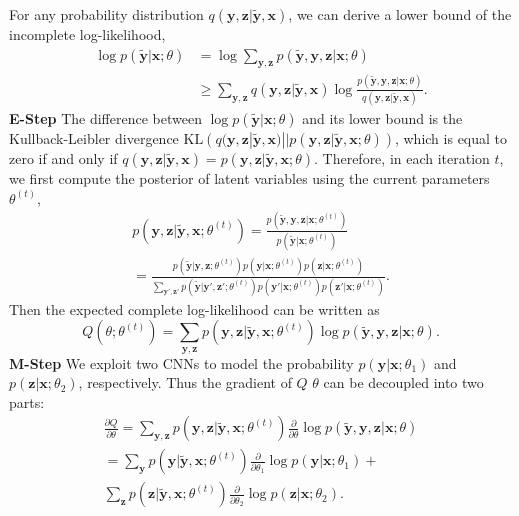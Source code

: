 \documentclass[10pt,twocolumn,letterpaper]{article}
\def\vec{\mathbf}
\begin{document}
For any probability distribution $q(\vec{y}, \vec{z} | \tilde{\vec{y}}, \vec{x})$, we can derive a lower bound of the incomplete log-likelihood,
\begin{equation}
\begin{aligned}
    \log p(\tilde{\vec{y}} | \vec{x}; \theta) &= \log \sum_{\vec{y},\vec{z}} p(\tilde{\vec{y}}, \vec{y}, \vec{z} | \vec{x}; \theta) \\
    &\geq \sum_{\vec{y},\vec{z}} q(\vec{y}, \vec{z} | \tilde{\vec{y}}, \vec{x}) \log \frac{p(\tilde{\vec{y}}, \vec{y}, \vec{z} | \vec{x}; \theta)}{q(\vec{y}, \vec{z} | \tilde{\vec{y}}, \vec{x})}.
\end{aligned}
\end{equation}
\textbf{E-Step} The difference between $\log p(\tilde{\vec{y}} | \vec{x}; \theta)$ and its lower bound is the Kullback-Leibler divergence $\mathrm{KL}\left(q(\vec{y}, \vec{z} | \tilde{\vec{y}}, \vec{x}) || p(\vec{y}, \vec{z} | \tilde{\vec{y}}, \vec{x}; \theta)\right)$, which is equal to zero if and only if $q(\vec{y}, \vec{z} | \tilde{\vec{y}}, \vec{x}) = p(\vec{y}, \vec{z} | \tilde{\vec{y}}, \vec{x}; \theta)$. Therefore, in each iteration $t$, we first compute the posterior of latent variables using the current parameters $\theta^{(t)}$,
\begin{multline} \label{eq:posterior}
    p(\vec{y}, \vec{z} | \tilde{\vec{y}}, \vec{x}; \theta^{(t)}) = \frac{p(\tilde{\vec{y}}, \vec{y}, \vec{z} | \vec{x}; \theta^{(t)})}{p(\tilde{\vec{y}} | \vec{x}; \theta^{(t)})} \\
    = \frac{p(\tilde{\vec{y}}|\vec{y},\vec{z};\theta^{(t)}) p(\vec{y}|\vec{x};\theta^{(t)}) p(\vec{z}|\vec{x};\theta^{(t)})}{\sum_{\vec{y}',\vec{z}'} p(\tilde{\vec{y}}|\vec{y}',\vec{z}';\theta^{(t)}) p(\vec{y}'|\vec{x};\theta^{(t)}) p(\vec{z}'|\vec{x};\theta^{(t)})}.
\end{multline}
Then the expected complete log-likelihood can be written as
\begin{equation}
    Q(\theta; \theta^{(t)}) = \sum_{\vec{y},\vec{z}} p(\vec{y}, \vec{z} | \tilde{\vec{y}}, \vec{x}; \theta^{(t)}) \log p(\tilde{\vec{y}}, \vec{y}, \vec{z} | \vec{x}; \theta).
\end{equation}
\textbf{M-Step} We exploit two CNNs to model the probability $p(\vec{y}|\vec{x};\theta_1)$ and $p(\vec{z}|\vec{x};\theta_2)$, respectively. Thus the gradient of $Q$ \wrt $\theta$ can be decoupled into two parts:
\begin{multline} \label{eq:gradient}
    \frac{\partial Q}{\partial \theta} = \sum_{\vec{y},\vec{z}} p(\vec{y}, \vec{z} | \tilde{\vec{y}}, \vec{x}; \theta^{(t)}) \frac{\partial}{\partial \theta} \log p(\tilde{\vec{y}}, \vec{y}, \vec{z} | \vec{x}; \theta) \\
    = \sum_{\vec{y}} p(\vec{y} | \tilde{\vec{y}}, \vec{x}; \theta^{(t)}) \frac{\partial}{\partial \theta_1} \log p(\vec{y}|\vec{x};\theta_1) + \\
      \sum_{\vec{z}} p(\vec{z} | \tilde{\vec{y}}, \vec{x}; \theta^{(t)}) \frac{\partial}{\partial \theta_2} \log p(\vec{z}|\vec{x};\theta_2).
\end{multline}
\end{document}
